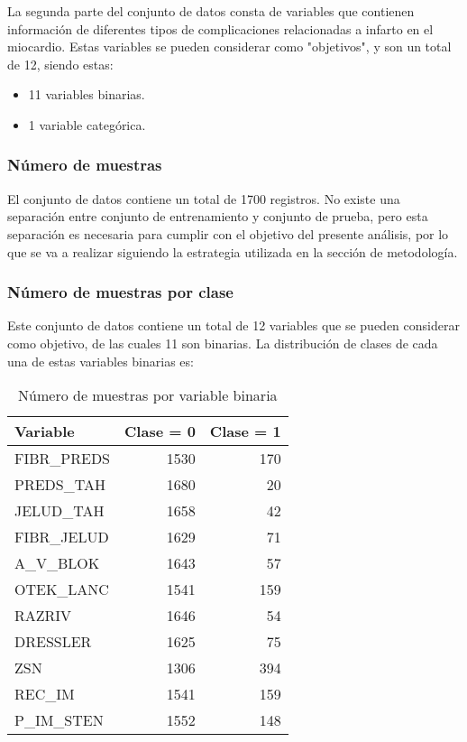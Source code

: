 \documentclass[conference]{IEEEtran}
\begin{document}
La segunda parte del conjunto de datos consta de variables que contienen información de diferentes tipos de complicaciones relacionadas a infarto en el miocardio. Estas variables se pueden considerar como "objetivos", y son un total de 12, siendo estas:
\begin{itemize}
\item 11 variables binarias.
\item 1 variable categórica.
\end{itemize}

\subsubsection{Número de muestras}\label{nmue}
El conjunto de datos contiene un total de 1700 registros. No existe una separación entre conjunto de entrenamiento y conjunto de prueba, pero esta separación es necesaria para cumplir con el objetivo del presente análisis, por lo que se va a realizar siguiendo la estrategia utilizada en la sección de metodología.

\subsubsection{Número de muestras por clase}\label{nmue}
Este conjunto de datos contiene un total de 12 variables que se pueden considerar como objetivo, de las cuales 11 son binarias. La distribución de clases de cada una de estas variables binarias es:

\begin{table}[ht]
\centering
\caption{Número de muestras por variable binaria}
\begin{tabular}{l|r|r}
\textbf{Variable} & \textbf{Clase = 0} & \textbf{Clase = 1} \\
\hline
\rule{0pt}{3ex}
    FIBR\_PREDS & 1530 & 170 \\
    PREDS\_TAH & 1680 & 20 \\
    JELUD\_TAH & 1658 & 42 \\
    FIBR\_JELUD & 1629 & 71 \\
    A\_V\_BLOK & 1643 & 57 \\
    OTEK\_LANC & 1541 & 159 \\
    RAZRIV & 1646 & 54 \\
    DRESSLER & 1625 & 75 \\
    ZSN & 1306 & 394 \\
    REC\_IM & 1541 & 159 \\
    P\_IM\_STEN & 1552 & 148 \\
\end{tabular}
\label{tab:num_samples}
\end{table}
\end{document}
